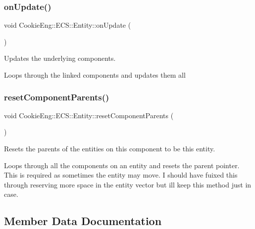 \subsubsection{\texorpdfstring{on\+Update()}{onUpdate()}}
{\footnotesize\ttfamily void Cookie\+Eng\+::\+E\+C\+S\+::\+Entity\+::on\+Update (\begin{DoxyParamCaption}{ }\end{DoxyParamCaption})\hspace{0.3cm}{\ttfamily [inline]}}



Updates the underlying components. 

Loops through the linked components and updates them all \mbox{\label{class_cookie_eng_1_1_e_c_s_1_1_entity_ac2074aee92bef04bdc4e3a8b430c4ad7}} 
\subsubsection{\texorpdfstring{reset\+Component\+Parents()}{resetComponentParents()}}
{\footnotesize\ttfamily void Cookie\+Eng\+::\+E\+C\+S\+::\+Entity\+::reset\+Component\+Parents (\begin{DoxyParamCaption}{ }\end{DoxyParamCaption})\hspace{0.3cm}{\ttfamily [inline]}}



Resets the parents of the entities on this component to be this entity. 

Loops through all the components on an entity and resets the parent pointer. This is required as sometimes the entity may move. I should have fuixed this through reserving more space in the entity vector but i\textquotesingle{}ll keep this method just in case. 

\subsection{Member Data Documentation}
\mbox{\label{class_cookie_eng_1_1_e_c_s_1_1_entity_ad57aaebd573658952dfa4ac9f1386f6d}} 

